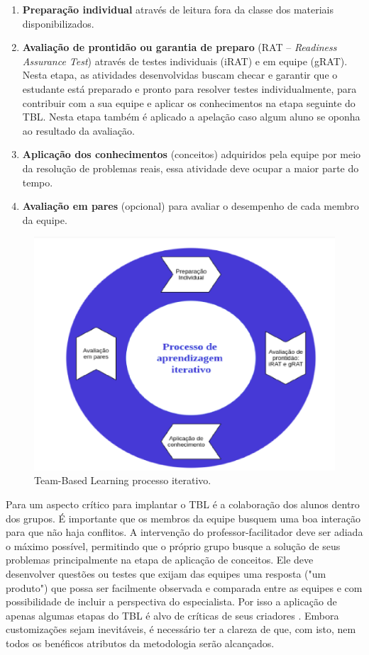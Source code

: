 \begin{enumerate}
  \item \textbf{Preparação individual} através de leitura fora da classe dos materiais disponibilizados.
  \item \textbf{Avaliação de prontidão ou garantia de preparo} (RAT – \textit{Readiness Assurance Test}) através de testes individuais  (iRAT) e em equipe (gRAT). Nesta etapa, as atividades desenvolvidas buscam checar e garantir que o estudante está preparado e pronto para resolver testes individualmente, para contribuir com a sua equipe e aplicar os conhecimentos na etapa seguinte do TBL. Nesta etapa também é aplicado a apelação caso algum aluno se oponha ao resultado da avaliação.
  \item \textbf{Aplicação dos conhecimentos} (conceitos) adquiridos pela equipe por meio da resolução de problemas reais, essa atividade deve ocupar a maior parte do tempo.
  \item \textbf{Avaliação em pares} (opcional) para avaliar o desempenho de cada membro da equipe.
\end{enumerate}

\begin{figure}[h!]
	\centering
  \includegraphics[keepaspectratio=true,scale=0.5]{figuras/tbl1.eps}
  \caption{Team-Based Learning processo iterativo. \cite{bollela}}
	\label{fig:tbl1}
\end{figure}

Para \cite{bollela} um aspecto crítico para implantar o TBL é a colaboração dos alunos dentro dos grupos. É importante que os membros da equipe busquem uma boa interação para que não haja conflitos. A intervenção do professor-facilitador deve ser adiada o máximo possível, permitindo que o próprio grupo busque a solução de seus problemas principalmente na etapa de aplicação de conceitos. Ele deve desenvolver questões ou testes que exijam das equipes uma resposta ("um produto") que possa ser facilmente observada e comparada entre as equipes e com possibilidade de incluir a perspectiva do especialista. Por isso a aplicação de apenas algumas etapas do TBL é alvo de críticas de seus criadores \cite{sweet}. Embora customizações sejam inevitáveis, é necessário ter a clareza de que, com isto, nem todos os benéficos atributos da metodologia serão alcançados.

